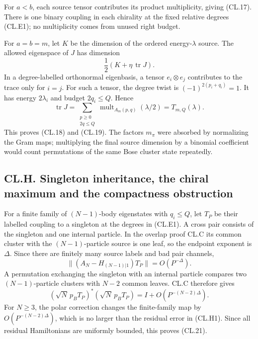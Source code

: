 \documentclass[a4paper,11pt]{article}
\numberwithin{equation}{section}
\begin{document}
For \(a<b\), each source tensor contributes its product multiplicity, giving (CL.17). There is one binary coupling in each chirality at the fixed relative degrees (CL.E1); no multiplicity comes from unused right budget.

For \(a=b=m\), let \(K\) be the dimension of the ordered energy-\(\lambda\) source. The allowed eigenspace of \(J\) has dimension \[
\frac12(K+\eta\,\operatorname{tr}J).
\] In a degree-labelled orthonormal eigenbasis, a tensor \(e_i\otimes e_j\) contributes to the trace only for \(i=j\). For such a tensor, the degree twist is \((-1)^{2(p_i+q_i)}=1\). It has energy \(2\lambda_i\) and budget \(2q_i\leq Q\). Hence \[
\operatorname{tr}J
=\sum_{\substack{p\geq0\\2q\leq Q}}
\operatorname{mult}_{A_m(p,q)}(\lambda/2)=T_{m,Q}(\lambda).
\tag{CL.G4}
\] This proves (CL.18) and (CL.19). The factors \(m_\pi\) were absorbed by normalizing the Gram maps; multiplying the final source dimension by a binomial coefficient would count permutations of the same Bose cluster state repeatedly.

\hypertarget{cl.h.-singleton-inheritance-the-chiral-maximum-and-the-compactness-obstruction}{%
\subsection{CL.H. Singleton inheritance, the chiral maximum and the compactness obstruction}\label{cl.h.-singleton-inheritance-the-chiral-maximum-and-the-compactness-obstruction}}

For a finite family of \((N-1)\)-body eigenstates with \(q_i\leq Q\), let \(T_P\) be their labelled coupling to a singleton at the degrees in (CL.E1). A cross pair consists of the singleton and one internal particle. In the overlap proof CL.C its common cluster with the \((N-1)\)-particle source is one leaf, so the endpoint exponent is \(\Delta\). Since there are finitely many source labels and bad pair channels, \[
\|(A_N-H_{(N-1)|1})T_P\|=O(P^{-\Delta}).
\tag{CL.H1}
\] A permutation exchanging the singleton with an internal particle compares two \((N-1)\)-particle clusters with \(N-2\) common leaves. CL.C therefore gives \[
(\sqrt N\,p_BT_P)^*(\sqrt N\,p_BT_P)
=I+O(P^{-(N-2)\Delta}).
\tag{CL.H2}
\] For \(N\geq3\), the polar correction changes the finite-family map by \(O(P^{-(N-2)\Delta})\), which is no larger than the residual error in (CL.H1). Since all residual Hamiltonians are uniformly bounded, this proves (CL.21).
\end{document}
